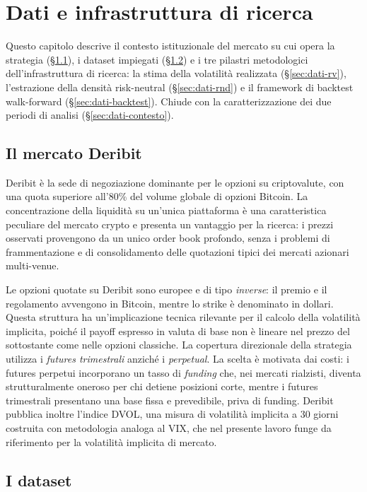 \chapter{Dati e infrastruttura di ricerca}
\label{ch:dati}

Questo capitolo descrive il contesto istituzionale del mercato su cui opera
la strategia (\S\ref{sec:dati-deribit}), i dataset impiegati
(\S\ref{sec:dati-dataset}) e i tre pilastri metodologici dell'infrastruttura
di ricerca: la stima della volatilità realizzata
(\S\ref{sec:dati-rv}), l'estrazione della densità risk-neutral
(\S\ref{sec:dati-rnd}) e il framework di backtest walk-forward
(\S\ref{sec:dati-backtest}). Chiude con la caratterizzazione dei due periodi
di analisi (\S\ref{sec:dati-contesto}).

\section{Il mercato Deribit}
\label{sec:dati-deribit}

Deribit è la sede di negoziazione dominante per le opzioni su criptovalute,
con una quota superiore all'80\% del volume globale di opzioni Bitcoin. La
concentrazione della liquidità su un'unica piattaforma è una caratteristica
peculiare del mercato crypto e presenta un vantaggio per la ricerca: i
prezzi osservati provengono da un unico order book profondo, senza i
problemi di frammentazione e di consolidamento delle quotazioni tipici dei
mercati azionari multi-venue.

Le opzioni quotate su Deribit sono europee e di tipo \emph{inverse}: il
premio e il regolamento avvengono in Bitcoin, mentre lo strike è denominato
in dollari. Questa struttura ha un'implicazione tecnica rilevante per il
calcolo della volatilità implicita, poiché il payoff espresso in valuta di
base non è lineare nel prezzo del sottostante come nelle opzioni classiche.
La copertura direzionale della strategia utilizza i \emph{futures
trimestrali} anziché i \emph{perpetual}. La scelta è motivata dai costi: i
futures perpetui incorporano un tasso di \emph{funding} che, nei mercati
rialzisti, diventa strutturalmente oneroso per chi detiene posizioni corte,
mentre i futures trimestrali presentano una base fissa e prevedibile, priva
di funding. Deribit pubblica inoltre l'indice DVOL, una misura di
volatilità implicita a 30 giorni costruita con metodologia analoga al VIX,
che nel presente lavoro funge da riferimento per la volatilità implicita di
mercato.

\section{I dataset}
\label{sec:dati-dataset}

